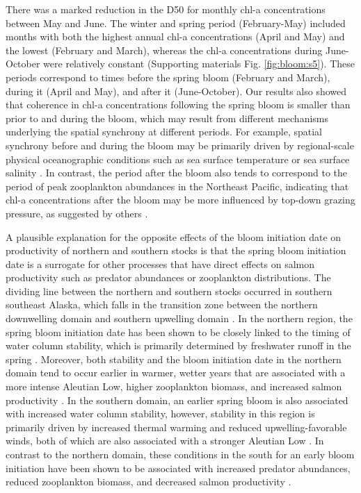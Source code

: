 There was a marked reduction in the D50 for monthly chl-a concentrations between
May and June. The winter and spring period (February-May) included months with
both the highest annual chl-a concentrations (April and May) and the lowest
(February and March), whereas the chl-a concentrations during June-October were
relatively constant (Supporting materials Fig. \ref{fig:bloom:s5}). These periods correspond to
times before the spring bloom (February and March), during it (April and May),
and after it (June-October). Our results also showed that coherence in chl-a
concentrations following the spring bloom is smaller than prior to and during
the bloom, which may result from different mechanisms underlying the spatial
synchrony at different periods. For example, spatial synchrony before and during
the bloom may be primarily driven by regional-scale physical oceanographic
conditions such as sea surface temperature or sea surface salinity
\citep{Henson2007a}. In contrast, the period after the bloom also tends to
correspond to the period of peak zooplankton abundances in the Northeast
Pacific, indicating that chl-a concentrations after the bloom may be more
influenced by top-down grazing pressure, as suggested by others
\citep{Chittenden2010a, Bornhold2000, Mackas2012}.

A plausible explanation for the opposite effects of the bloom initiation date on
productivity of northern and southern stocks is that the spring bloom initiation
date is a surrogate for other processes that have direct effects on salmon
productivity such as predator abundances or zooplankton distributions. The
dividing line between the northern and southern stocks occurred in southern
southeast Alaska, which falls in the transition zone between the northern
downwelling domain and southern upwelling domain \citep{Ware1989a}. In the
northern region, the spring bloom initiation date has been shown to be closely
linked to the timing of water column stability, which is primarily determined by
freshwater runoff in the spring \citep{Weingartner2005a, Henson2007a}. Moreover,
both stability and the bloom initiation date in the northern domain tend to
occur earlier in warmer, wetter years that are associated with a more intense
Aleutian Low, higher zooplankton biomass, and increased salmon productivity
\citep{Brodeur1992a, Mueter2002a}. In the southern domain, an earlier spring
bloom is also associated with increased water column stability, however,
stability in this region is primarily driven by increased thermal warming and
reduced upwelling-favorable winds, both of which are also associated with a
stronger Aleutian Low \citep{Polovina1995a, Henson2007a}. In contrast to the
northern domain, these conditions in the south for an early bloom initiation
have been shown to be associated with increased predator abundances, reduced
zooplankton biomass, and decreased salmon productivity \citep{Ware1995a,
Mackas2001a, Mueter2002a}.

